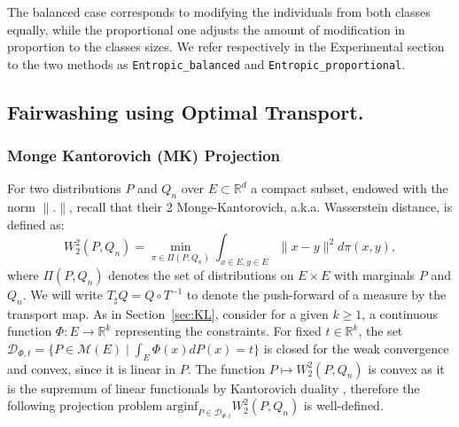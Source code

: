 \documentclass[runningheads, orivec]{llncs}
\newcommand{\R}{\mathbb{R}}
\begin{document}
  \begin{remark}
        The balanced case corresponds to modifying %
        the individuals from both classes %
        equally, while the proportional one adjusts the amount of modification in proportion to the %
        classes sizes.   We refer respectively in the Experimental section to the two methods as \texttt{Entropic\_balanced} and \texttt{Entropic\_proportional}.%
    \end{remark}

\subsection{Fairwashing using Optimal Transport.}
\label{sec:W2}
\subsubsection{Monge Kantorovich (MK) Projection} \label{sec:monge_kanto_proj} \label{sec:wass_grad}
For two distributions $P$ and $Q_n$ over $E \subset\R^d$ a compact subset, endowed with the norm $\|.\|$, recall that their 2 Monge-Kantorovich, a.k.a. Wasserstein distance, is defined as:
  \begin{equation}
   \label{eq:d_Wass}
  W_2^2(P,Q_n)= \min_{\pi \in \Pi(P,Q_n)} \int_{x\in E,y\in E} \parallel x-y \parallel^2 d\pi(x,y),
   \end{equation}
where $\Pi(P,Q_n)$ denotes the set of distributions on $E \times E$ with marginals $P$ and $Q_n$. We will write $T_{\sharp} Q = Q \circ T^{-1}$ to denote the push-forward of a measure by the transport map. As in Section~\ref{sec:KL}, consider for a given $k\geq1$, a continuous function $\Phi\colon E\to\R^k$
representing the constraints. For fixed $t\in\R^k$, the set $\mathcal{D}_{\Phi,t} = \{P\in\mathcal{M}(E)\mid \int_E \Phi(x)dP(x) = t\} $ is closed for the weak convergence and convex, since it is linear in $P$. The function $ P \mapsto W_2^2(P,Q_n)
$ is convex as it is the supremum of linear functionals by Kantorovich duality \cite{sant}, therefore the following projection problem $\mathrm{arginf}_{P\in\mathcal{D}_{\Phi,t}}W_2^2(P,Q_n)$ is well-defined.
   
\end{document}

